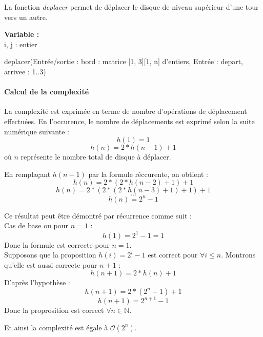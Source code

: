La fonction \emph{deplacer} permet de déplacer le disque de niveau supérieur d'une tour vers un autre.

\begin{function}[H]
    \textbf{Variable :}\\
    i, j : entier\;
    \caption{deplacer(Entrée/sortie : bord : matrice {[1, 3]}{[1, n]} d'entiers, Entrée : depart, arrivee : 1..3)}
\end{function}

\paragraph{Calcul de la complexité}
La complexité est exprimée en terme de nombre d'opérations de déplacement effectuées. En l'occurence, le nombre de déplacements est exprimé selon la suite numérique suivante :
$$ h(1) = 1 $$
$$ h(n) = 2 * h(n - 1) + 1 $$
où $n$ représente le nombre total de disque à déplacer.

En remplaçant $h(n - 1)$ par la formule réccurente, on obtient :
$$ h(n) = 2 * (2 * h(n - 2) + 1) + 1 $$
$$ h(n) = 2 * (2 * (2 * h(n - 3) + 1) + 1) + 1 $$
$$ ... $$
$$ h(n) = 2^{n} - 1 $$

Ce résultat peut être démontré par récurrence comme suit :\\
Cas de base ou pour $n = 1$ :
$$ h(1) = 2^{1} - 1 = 1$$
Donc la formule est correcte pour $n = 1$.\\
Supposons que la proposition $h(i) = 2^{i} - 1$ est correct pour $\forall i \leq n$. Montrons qu'elle est aussi correcte pour $n + 1$ :
$$ h(n + 1) = 2 * h(n) + 1$$
D'après l'hypothèse :
$$ h(n + 1) = 2 * (2^{n} - 1) + 1 $$
$$ h(n + 1) = 2^{n + 1} - 1$$
Donc la proprosition est correct $\forall n \in \mathbb{N}$.\par
Et ainsi la complexité est égale à $\mathcal{O}(2^{n})$.

